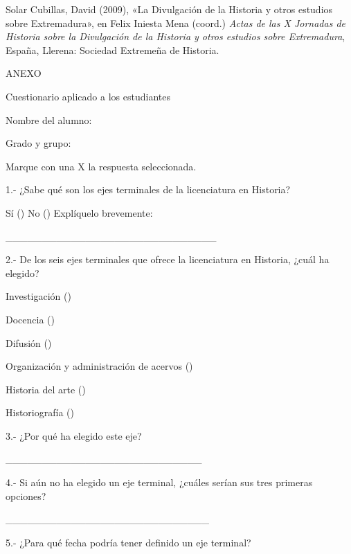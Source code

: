 Solar Cubillas, David (2009), «La Divulgación de la Historia y 
otros estudios sobre Extremadura»,  en Felix Iniesta Mena (coord.) 
\textit{Actas de las X Jornadas de Historia sobre la Divulgación de la 
Historia y otros estudios sobre Extremadura}, España,
Llerena: Sociedad Extremeña de Historia.
\newpage



{\centering ANEXO \par}

{\centering Cuestionario aplicado a los estudiantes \par}


\bigskip
Nombre del alumno: \hrulefill 


Grado y grupo: \hrulefill


Marque con una X la respuesta seleccionada.


1.- ¿Sabe qué son los ejes terminales de la licenciatura en Historia?


Sí  (\phantom{abc})  No (\phantom{abc})  Explíquelo brevemente:

\hrulefill{}

\_\_\_\_\_\_\_\_\_\_\_\_\_\_\_\_\_\_\_\_\_\_\_\_\_\_\_\_\_


2.- De los seis ejes terminales que ofrece la licenciatura en Historia, ¿cuál ha
elegido?


Investigación  (\phantom{abc})


Docencia  (\phantom{abc})


Difusión  (\phantom{abc})


Organización y administración de acervos  (\phantom{abc})


Historia del arte  (\phantom{abc})


Historiografía  (\phantom{abc})


3.- ¿Por qué ha elegido este eje?


\hrulefill{}

\hrulefill{}

\_\_\_\_\_\_\_\_\_\_\_\_\_\_\_\_\_\_\_\_\_\_\_\_\_\_\_


4.- Si aún no ha elegido un eje terminal, ¿cuáles serían sus tres primeras
opciones?\\ 

\hrulefill{}

\_\_\_\_\_\_\_\_\_\_\_\_\_\_\_\_\_\_\_\_\_\_\_\_\_\_\_\_\par


\par
5.- ¿Para qué fecha podría tener definido un eje terminal?\par


